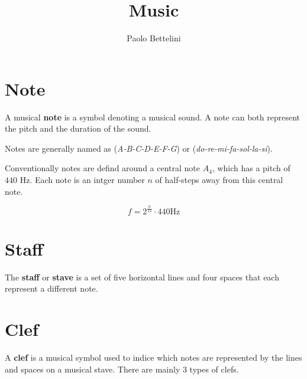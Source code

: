 \documentclass{article}
\title{Music}
\author{Paolo Bettelini}
\date{}
\begin{document}
\maketitle
\tableofcontents
\pagebreak

\section{Note}

A musical \textbf{note} is a symbol denoting a musical sound.
A note can both represent the pitch and the duration of the sound.

Notes are generally named as (\textit{A-B-C-D-E-F-G}) or (\textit{do-re-mi-fa-sol-la-si}).

Conventionally notes are defind around a central note \(A_4\), which has a pitch of
\(440\) Hz. Each note is an intger number \(n\) of half-steps away from this central note.

\[
    f = 2^\frac{n}{12} \cdot 440 \text{Hz}
\]

\section{Staff}

The \textbf{staff} or \textbf{stave} is a set of five horizontal lines and four spaces that each represent a different
note.


\section{Clef}

A \textbf{clef} is a musical symbol used to indice which notes are represented
by the lines and spaces on a musical stave.
There are mainly 3 types of clefs.
\end{document}
